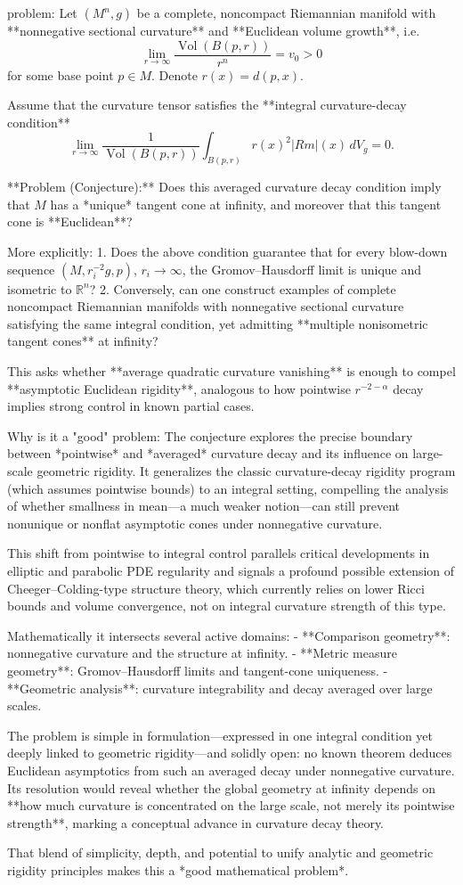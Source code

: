 problem:  
Let \((M^n,g)\) be a complete, noncompact Riemannian manifold with **nonnegative sectional curvature** and **Euclidean volume growth**, i.e.  
\[
\lim_{r\to\infty}\frac{\operatorname{Vol}(B(p,r))}{r^n}=v_0>0
\]
for some base point \(p\in M\).  Denote \(r(x)=d(p,x)\).  

Assume that the curvature tensor satisfies the **integral curvature-decay condition**
\[
\lim_{r\to\infty}\frac{1}{\operatorname{Vol}(B(p,r))}\int_{B(p,r)} r(x)^2 |Rm|(x)\, dV_g = 0.
\]

**Problem (Conjecture):**  
Does this averaged curvature decay condition imply that \(M\) has a *unique* tangent cone at infinity, and moreover that this tangent cone is **Euclidean**?  

More explicitly:
1. Does the above condition guarantee that for every blow-down sequence \((M,r_i^{-2}g,p)\), \(r_i\to\infty\), the Gromov–Hausdorff limit is unique and isometric to \(\mathbb{R}^n\)?  
2. Conversely, can one construct examples of complete noncompact Riemannian manifolds with nonnegative sectional curvature satisfying the same integral condition, yet admitting **multiple nonisometric tangent cones** at infinity?

This asks whether **average quadratic curvature vanishing** is enough to compel **asymptotic Euclidean rigidity**, analogous to how pointwise \(r^{-2-\alpha}\) decay implies strong control in known partial cases.  

Why is it a "good" problem:  
The conjecture explores the precise boundary between *pointwise* and *averaged* curvature decay and its influence on large-scale geometric rigidity. It generalizes the classic curvature-decay rigidity program (which assumes pointwise bounds) to an integral setting, compelling the analysis of whether smallness in mean—a much weaker notion—can still prevent nonunique or nonflat asymptotic cones under nonnegative curvature.  

This shift from pointwise to integral control parallels critical developments in elliptic and parabolic PDE regularity and signals a profound possible extension of Cheeger–Colding-type structure theory, which currently relies on lower Ricci bounds and volume convergence, not on integral curvature strength of this type.  

Mathematically it intersects several active domains:
- **Comparison geometry**: nonnegative curvature and the structure at infinity.  
- **Metric measure geometry**: Gromov–Hausdorff limits and tangent-cone uniqueness.  
- **Geometric analysis**: curvature integrability and decay averaged over large scales.  

The problem is simple in formulation—expressed in one integral condition yet deeply linked to geometric rigidity—and solidly open: no known theorem deduces Euclidean asymptotics from such an averaged decay under nonnegative curvature. Its resolution would reveal whether the global geometry at infinity depends on **how much curvature is concentrated on the large scale, not merely its pointwise strength**, marking a conceptual advance in curvature decay theory.  

That blend of simplicity, depth, and potential to unify analytic and geometric rigidity principles makes this a *good mathematical problem*.